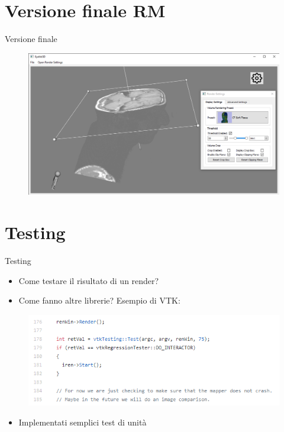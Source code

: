 \documentclass{beamer}
\begin{document}
	
	\section{Versione finale RM}
	\begin{frame}{Versione finale}
	
	\begin{figure}[ht]
    	\centering
    	\includegraphics[width=1\textwidth]{Images/rmcapture.png}
	\end{figure}
	
	\end{frame}
	
	
	\section{Testing}
	\begin{frame}{Testing}
	
	\begin{itemize}
		\item Come testare il risultato di un render?
		\item Come fanno altre librerie? Esempio di VTK:
	\end{itemize}	
	
	\begin{figure}[ht]
    	\centering
    	\includegraphics[width=1\textwidth]{Images/vtktests.png}
	\end{figure}
	
	\begin{itemize}
		\item Implementati semplici test di unità
	\end{itemize}
	
	\end{frame}
	
\end{document}
